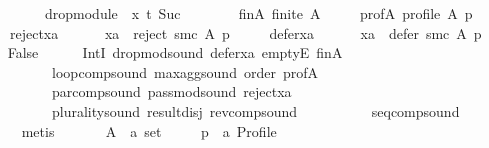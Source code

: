 \begin{isabellebody}
\ \ \ \ \ \ \ \ \ drop{\isacharunderscore}{\kern0pt}module\ {}\ x\ {\isasymcirclearrowleft}\isactrlsub {\isacharquery}{\kern0pt}t\ {\isacharparenleft}{\kern0pt}Suc\ {}{\isacharparenright}{\kern0pt}{\isachardoublequoteclose}\isanewline
\ \ \isamarkupfalse%
\isanewline
\ \ \ \ fin{\isacharunderscore}{\kern0pt}A{\isacharcolon}{\kern0pt}\ {\isachardoublequoteopen}finite\ A{\isachardoublequoteclose}\ \isanewline
\ \ \ \ prof{\isacharunderscore}{\kern0pt}A{\isacharcolon}{\kern0pt}\ {\isachardoublequoteopen}profile\ A\ p{\isachardoublequoteclose}\ \isanewline
\ \ \ \ reject{\isacharunderscore}{\kern0pt}xa{\isacharcolon}{\kern0pt}\isanewline
\ \ \ \ \ \ {\isachardoublequoteopen}xa\ {\isasymin}\ reject\ {\isacharparenleft}{\kern0pt}{\isacharquery}{\kern0pt}smc{\isacharparenright}{\kern0pt}\ A\ p{\isachardoublequoteclose}\ \isanewline
\ \ \ \ defer{\isacharunderscore}{\kern0pt}xa{\isacharcolon}{\kern0pt}\isanewline
\ \ \ \ \ \ {\isachardoublequoteopen}xa\ {\isasymin}\ defer\ {\isacharparenleft}{\kern0pt}{\isacharquery}{\kern0pt}smc{\isacharparenright}{\kern0pt}\ A\ p{\isachardoublequoteclose}\isanewline
\ \ \isamarkupfalse%
\ {\isachardoublequoteopen}False{\isachardoublequoteclose}\isanewline
\ \ \ \ \isamarkupfalse%
\ IntI\ drop{\isacharunderscore}{\kern0pt}mod{\isacharunderscore}{\kern0pt}sound\ defer{\isacharunderscore}{\kern0pt}xa\ emptyE\ fin{\isacharunderscore}{\kern0pt}A\isanewline
\ \ \ \ \ \ \ \ \ \ loop{\isacharunderscore}{\kern0pt}comp{\isacharunderscore}{\kern0pt}sound\ max{\isacharunderscore}{\kern0pt}agg{\isacharunderscore}{\kern0pt}sound\ order\ prof{\isacharunderscore}{\kern0pt}A\isanewline
\ \ \ \ \ \ \ \ \ \ par{\isacharunderscore}{\kern0pt}comp{\isacharunderscore}{\kern0pt}sound\ pass{\isacharunderscore}{\kern0pt}mod{\isacharunderscore}{\kern0pt}sound\ reject{\isacharunderscore}{\kern0pt}xa\isanewline
\ \ \ \ \ \ \ \ \ \ plurality{\isacharunderscore}{\kern0pt}sound\ result{\isacharunderscore}{\kern0pt}disj\ rev{\isacharunderscore}{\kern0pt}comp{\isacharunderscore}{\kern0pt}sound\isanewline
\ \ \ \ \ \ \ \ \ \ seq{\isacharunderscore}{\kern0pt}comp{\isacharunderscore}{\kern0pt}sound\isanewline
\ \ \ \ \isamarkupfalse%
\ metis\isanewline
{}\isamarkupfalse%
\isanewline
\ \ \isamarkupfalse%
\isanewline
\ \ \ \ A\ {\isacharcolon}{\kern0pt}{\isacharcolon}{\kern0pt}\ {\isachardoublequoteopen}{\isacharprime}{\kern0pt}a\ set{\isachardoublequoteclose}\ \isanewline
\ \ \ \ p\ {\isacharcolon}{\kern0pt}{\isacharcolon}{\kern0pt}\ {\isachardoublequoteopen}{\isacharprime}{\kern0pt}a\ Profile{\isachardoublequoteclose}\ \isanewline

\end{isabellebody}
